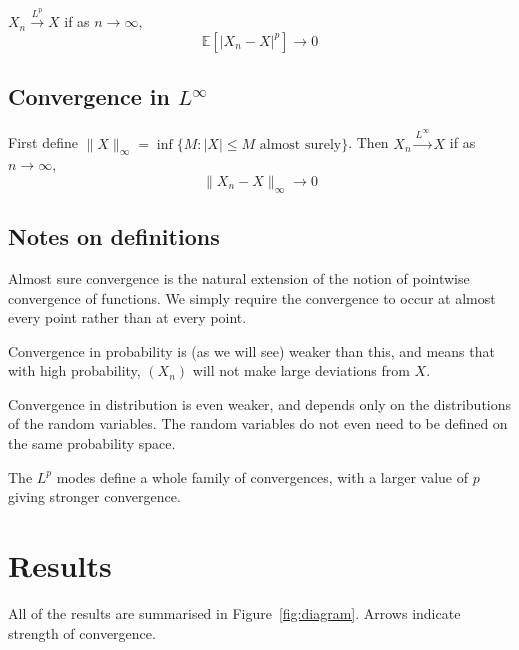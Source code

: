 \documentclass{article}
\begin{document}
$X_n \xrightarrow{L^p} X$
if as $n \to \infty$,
$$\mathbb{E}[|X_n - X|^p] \to 0$$

\subsection*{Convergence in $L^\infty$}
First define $\|X\|_\infty = \inf\{M: |X| \leq M \text{ almost surely}\}$.
Then $X_n \xrightarrow{L^\infty} X$
if as $n \to \infty$,
$$\|X_n - X\|_\infty \to 0$$

\subsection*{Notes on definitions}

Almost sure convergence is the natural extension of the
notion of pointwise convergence of functions.
We simply require the convergence to occur at almost every point rather
than at every point.

Convergence in probability is (as we will see) weaker than this, and means that
with high probability, $(X_n)$ will not make large deviations from $X$.

Convergence in distribution is even weaker, and depends only on the
distributions of the random variables.
The random variables do not even need to be defined on the same probability space.

The $L^p$ modes define a whole family of convergences, with a larger value of $p$ giving
stronger convergence.


\section{Results}

All of the results are summarised in Figure~\ref{fig:diagram}.
Arrows indicate strength of convergence.
\end{document}
